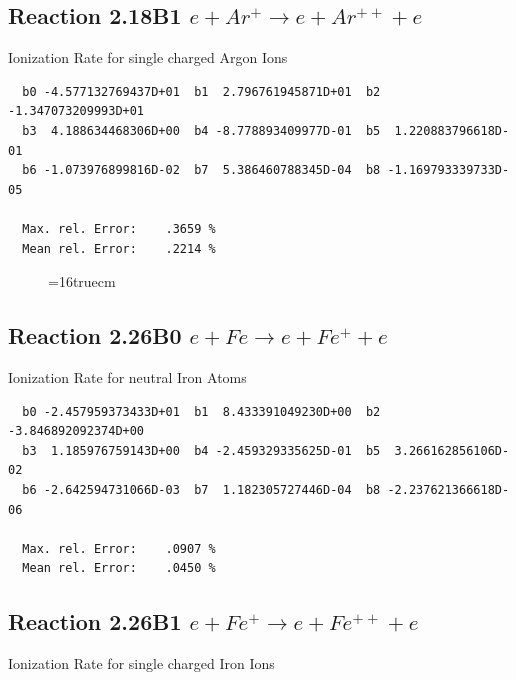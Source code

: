 \documentclass[12pt,dvipdfmx]{article}
\begin{document}
\subsection{
Reaction 2.18B1   $e + Ar^+ \rightarrow e + Ar^{++} + e$
}

  Ionization Rate for single charged Argon Ions

\begin{small}\begin{verbatim}
  b0 -4.577132769437D+01  b1  2.796761945871D+01  b2 -1.347073209993D+01
  b3  4.188634468306D+00  b4 -8.778893409977D-01  b5  1.220883796618D-01
  b6 -1.073976899816D-02  b7  5.386460788345D-04  b8 -1.169793339733D-05

  Max. rel. Error:    .3659 %
  Mean rel. Error:    .2214 %

\end{verbatim}\end{small}


\begin{figure} \label{2.18B}
\epsfxsize=16truecm
\end{figure}
\newpage



\subsection{
Reaction 2.26B0   $e + Fe  \rightarrow e + Fe^+  + e$
}

  Ionization Rate for neutral Iron Atoms

\begin{small}\begin{verbatim}
  b0 -2.457959373433D+01  b1  8.433391049230D+00  b2 -3.846892092374D+00
  b3  1.185976759143D+00  b4 -2.459329335625D-01  b5  3.266162856106D-02
  b6 -2.642594731066D-03  b7  1.182305727446D-04  b8 -2.237621366618D-06

  Max. rel. Error:    .0907 %
  Mean rel. Error:    .0450 %

\end{verbatim}\end{small}



\subsection{
Reaction 2.26B1   $e + Fe^+ \rightarrow e + Fe^{++} + e$
}

  Ionization Rate for single charged Iron Ions
\end{document}
